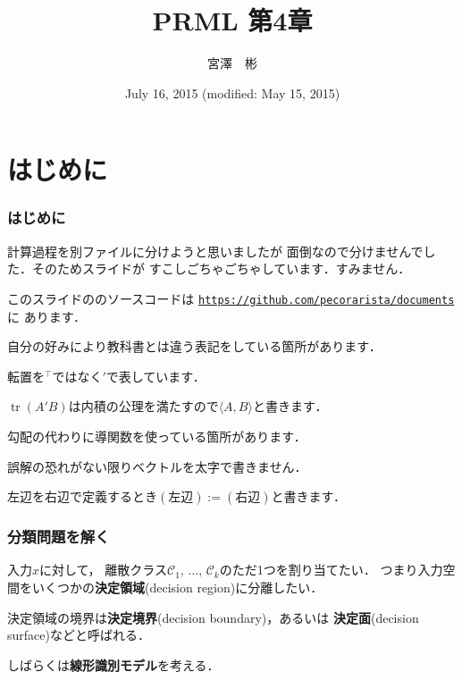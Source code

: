 \documentclass[10pt,usepdftitle=false,hyperref={unicode}]{beamer}
\title{PRML 第4章}
\institute{総合研究大学院大学 博士前期1年\newline\newline\texttt{miyazawa-a@nii.ac.jp}}
\author{宮澤　彬}
\date{July 16, 2015 (modified: May 15, 2015)}
\DeclareMathOperator*{\tr}{tr}
\newenvironment{wideitemize}{\itemize\addtolength{\itemsep}{1em}}{\enditemize}
\begin{document}
\nocite{bishop2008}
\begin{frame}
\maketitle
\end{frame}

\section{はじめに}

\begin{frame}
    \frametitle{はじめに}
    \begin{wideitemize}
        \item 計算過程を別ファイルに分けようと思いましたが
            面倒なので分けませんでした．そのためスライドが
            すこしごちゃごちゃしています．すみません．
        \item このスライドの{\LuaLaTeX}のソースコードは
            \href{https://github.com/pecorarista/documents}{\texttt{https://github.com/pecorarista/documents}}に
            あります．
        \item 自分の好みにより教科書とは違う表記をしている箇所があります．
            \begin{wideitemize}
                \item 転置を${}^\top$ではなく${}'$で表しています．
                \item $\tr (A'B)$は内積の公理を満たすので$\langle A, B\rangle$と書きます．
                \item 勾配の代わりに導関数を使っている箇所があります．
                \item 誤解の恐れがない限りベクトルを太字で書きません．
                \item 左辺を右辺で定義するとき$(\text{左辺}):=(\text{右辺})$と書きます．
            \end{wideitemize}
    \end{wideitemize}
\end{frame}

\begin{frame}
    \frametitle{分類問題を解く}
    入力$x$に対して，
    離散クラス$\mathcal{C}_1,\,\ldots,\,\mathcal{C}_k$のただ1つを割り当てたい．
    つまり入力空間をいくつかの\textbf{決定領域}(decision region)に分離したい．

    \bigskip

    決定領域の境界は\textbf{決定境界}(decision boundary)，あるいは
    \textbf{決定面}(decision surface)などと呼ばれる．

    \bigskip

    しばらくは\textbf{線形識別モデル}を考える．

\end{frame}
\end{document}
